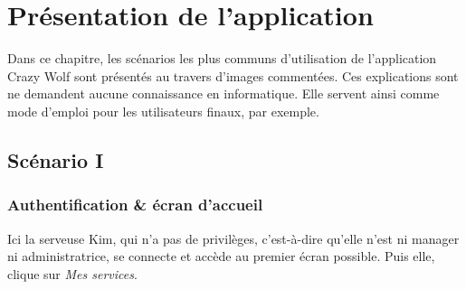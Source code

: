 \chapter[L'application]{Présentation de l'application}

Dans ce chapitre, les scénarios les plus communs
 d'utilisation de l'application Crazy Wolf sont 
 présentés au travers d'images commentées. Ces explications sont ne demandent aucune connaissance en informatique. Elle servent ainsi comme mode d'emploi pour les utilisateurs finaux, par exemple.

\section[Authentification \& écran d'accueil - Scénario I]{Scénario I}
\subsection*{Authentification \& écran d'accueil}
Ici la serveuse Kim, qui n'a pas de privilèges, c'est-à-dire qu'elle n'est 
ni manager ni administratrice, se connecte et accède au premier écran possible.
Puis elle, clique sur \textit{Mes services}.

